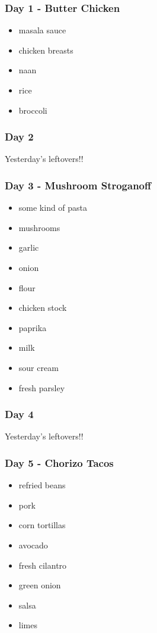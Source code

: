 \documentclass[11pt, a4paper]{article}
\begin{document}
\subsubsection{Day 1 - Butter Chicken}
\vspace{1pc}
\begin{itemize}
\item masala sauce
\item chicken breasts
\item naan
\item rice
\item broccoli 
\end{itemize}

\subsubsection{Day 2}
\vspace{1pc}
Yesterday's leftovers!!

\subsubsection{Day 3 - Mushroom Stroganoff}
\vspace{1pc}
\begin{itemize}
\item some kind of pasta
\item mushrooms
\item garlic 
\item onion
\item flour
\item chicken stock
\item paprika
\item milk
\item sour cream
\item fresh parsley
\end{itemize}

\subsubsection{Day 4}
\vspace{1pc}
Yesterday's leftovers!!

\subsubsection{Day 5 - Chorizo Tacos}
\vspace{1pc}
\begin{itemize}
\item refried beans
\item pork
\item corn tortillas
\item avocado
\item fresh cilantro
\item green onion
\item salsa
\item limes 
\end{itemize}
\end{document}
